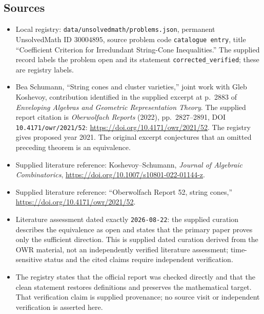 \documentclass[11pt]{article}
\begin{document}
\subsection{Sources}
\begin{itemize}
\item Local registry: \texttt{data/unsolvedmath/problems.json}, permanent UnsolvedMath ID \(30004895\), source problem code \texttt{catalogue entry}, title ``Coefficient Criterion for Irredundant String-Cone Inequalities.'' The supplied record labels the problem open and its statement \texttt{corrected\_verified}; these are registry labels.
\item Bea Schumann, ``String cones and cluster varieties,'' joint work with Gleb Koshevoy, contribution identified in the supplied excerpt at p.~2883 of \emph{Enveloping Algebras and Geometric Representation Theory}. The supplied report citation is \emph{Oberwolfach Reports} (2022), pp.~2827--2891, DOI \texttt{10.4171/owr/2021/52}: \url{https://doi.org/10.4171/owr/2021/52}. The registry gives proposed year 2021. The original excerpt conjectures that an omitted preceding theorem is an equivalence.
\item Supplied literature reference: Koshevoy--Schumann, \emph{Journal of Algebraic Combinatorics}, \url{https://doi.org/10.1007/s10801-022-01144-z}.
\item Supplied literature reference: ``Oberwolfach Report 52, string cones,'' \url{https://doi.org/10.4171/owr/2021/52}.
\item Literature assessment dated exactly \texttt{2026-08-22}: the supplied curation describes the equivalence as open and states that the primary paper proves only the sufficient direction. This is supplied dated curation derived from the OWR material, not an independently verified literature assessment; time-sensitive status and the cited claims require independent verification.
\item The registry states that the official report was checked directly and that the clean statement restores definitions and preserves the mathematical target. That verification claim is supplied provenance; no source visit or independent verification is asserted here.
\end{itemize}
\end{document}
